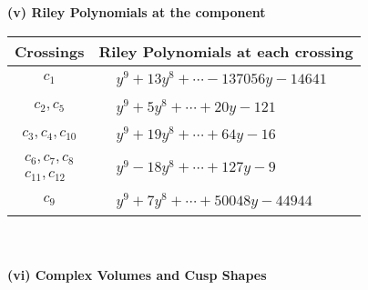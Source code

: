 \documentclass[1p]{elsarticle_modified}
\theoremstyle{definition}
\begin{document}
\newpage\renewcommand{\arraystretch}{1}
\flushleft \textbf{(v) Riley Polynomials at the component}\newline \\
\begin{tabular}{m{50pt}|m{274pt}}
Crossings & \hspace{64pt}Riley Polynomials at each crossing \\
\hline $$\begin{aligned}c_{1}\end{aligned}$$&$\begin{aligned}
&y^9+13 y^8+\cdots-137056 y-14641
\end{aligned}$\\
\hline $$\begin{aligned}c_{2},c_{5}\end{aligned}$$&$\begin{aligned}
&y^9+5 y^8+\cdots+20 y-121
\end{aligned}$\\
\hline $$\begin{aligned}c_{3},c_{4},c_{10}\end{aligned}$$&$\begin{aligned}
&y^9+19 y^8+\cdots+64 y-16
\end{aligned}$\\
\hline $$\begin{aligned}c_{6},c_{7},c_{8}\\c_{11},c_{12}\end{aligned}$$&$\begin{aligned}
&y^9-18 y^8+\cdots+127 y-9
\end{aligned}$\\
\hline $$\begin{aligned}c_{9}\end{aligned}$$&$\begin{aligned}
&y^9+7 y^8+\cdots+50048 y-44944
\end{aligned}$\\
\hline
\end{tabular}\\~\\
\newpage\flushleft \textbf{(vi) Complex Volumes and Cusp Shapes}
\end{document}
